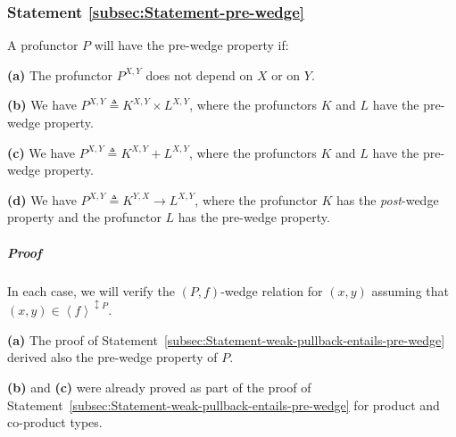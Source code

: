\begin{comment}
\textbf{(e)} The 

{*}{*}{*}
\end{comment}


\subsubsection{Statement \label{subsec:Statement-pre-wedge}\ref{subsec:Statement-pre-wedge}}

A profunctor $P$ will have the pre-wedge property if:

\textbf{(a)} The profunctor $P^{X,Y}$ does not depend on $X$ or
on $Y$.

\textbf{(b)} We have $P^{X,Y}\triangleq K^{X,Y}\times L^{X,Y}$, where
the profunctors $K$ and $L$ have the pre-wedge property.

\textbf{(c)} We have $P^{X,Y}\triangleq K^{X,Y}+L^{X,Y}$, where the
profunctors $K$ and $L$ have the pre-wedge property.

\textbf{(d)} We have $P^{X,Y}\triangleq K^{Y,X}\rightarrow L^{X,Y}$,
where the profunctor $K$ has the \emph{post}-wedge property and the
profunctor $L$ has the pre-wedge property.

\begin{comment}
\textbf{(e)} We have a recursive type $P^{X,Y}\triangleq S^{X,Y,P^{X,Y}}$,
where $S^{X,Y,R}$ is contravariant in $X$ and covariant in $Y$
and $R$, and has the pre-wedge property when viewed as a profunctor
with respect to $X$ and $Y$.
\end{comment}


\subparagraph{Proof}

In each case, we will verify the $\left(P,f\right)$-wedge relation
for $(x,y)$ assuming that $(x,y)\in\left<f\right>^{\updownarrow P}$. 

\textbf{(a)} The proof of Statement~\ref{subsec:Statement-weak-pullback-entails-pre-wedge}
derived also the pre-wedge property of $P$.

\textbf{(b)} and \textbf{(c)} were already proved as part of the proof
of Statement~\ref{subsec:Statement-weak-pullback-entails-pre-wedge}
for product and co-product types.

